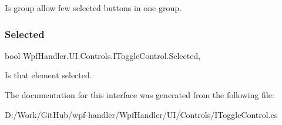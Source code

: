 Is group allow few selected buttons in one group. 

\mbox{\label{interface_wpf_handler_1_1_u_i_1_1_controls_1_1_i_toggle_control_a7262e3301c8625f3104105ed336bc427}} 
\subsubsection{\texorpdfstring{Selected}{Selected}}
{\footnotesize\ttfamily bool Wpf\+Handler.\+U\+I.\+Controls.\+I\+Toggle\+Control.\+Selected\hspace{0.3cm}{\ttfamily [get]}, {\ttfamily [set]}}



Is that element selected. 



The documentation for this interface was generated from the following file\+:\begin{DoxyCompactItemize}
\item 
D\+:/\+Work/\+Git\+Hub/wpf-\/handler/\+Wpf\+Handler/\+U\+I/\+Controls/I\+Toggle\+Control.\+cs\end{DoxyCompactItemize}
